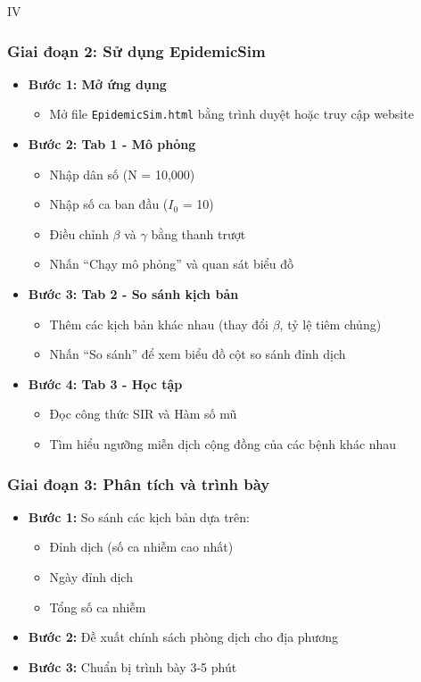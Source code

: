 \documentclass[12pt,a4paper]{article}
\begin{document}
\begin{competitionsection}{IV}
\subsubsection*{Giai đoạn 2: Sử dụng EpidemicSim}
\begin{itemize}[leftmargin=*,noitemsep]
\item \textbf{Bước 1: Mở ứng dụng}
    \begin{itemize}
    \item Mở file \texttt{EpidemicSim.html} bằng trình duyệt hoặc truy cập website
    \end{itemize}
\item \textbf{Bước 2: Tab 1 - Mô phỏng}
    \begin{itemize}
    \item Nhập dân số (N = 10,000)
    \item Nhập số ca ban đầu ($I_0$ = 10)
    \item Điều chỉnh $\beta$ và $\gamma$ bằng thanh trượt
    \item Nhấn ``Chạy mô phỏng'' và quan sát biểu đồ
    \end{itemize}
\item \textbf{Bước 3: Tab 2 - So sánh kịch bản}
    \begin{itemize}
    \item Thêm các kịch bản khác nhau (thay đổi $\beta$, tỷ lệ tiêm chủng)
    \item Nhấn ``So sánh'' để xem biểu đồ cột so sánh đỉnh dịch
    \end{itemize}
\item \textbf{Bước 4: Tab 3 - Học tập}
    \begin{itemize}
    \item Đọc công thức SIR và Hàm số mũ
    \item Tìm hiểu ngưỡng miễn dịch cộng đồng của các bệnh khác nhau
    \end{itemize}
\end{itemize}

\subsubsection*{Giai đoạn 3: Phân tích và trình bày}
\begin{itemize}[leftmargin=*,noitemsep]
\item \textbf{Bước 1:} So sánh các kịch bản dựa trên:
    \begin{itemize}
    \item Đỉnh dịch (số ca nhiễm cao nhất)
    \item Ngày đỉnh dịch
    \item Tổng số ca nhiễm
    \end{itemize}
\item \textbf{Bước 2:} Đề xuất chính sách phòng dịch cho địa phương
\item \textbf{Bước 3:} Chuẩn bị trình bày 3-5 phút
\end{itemize}


\end{competitionsection}
\end{document}
